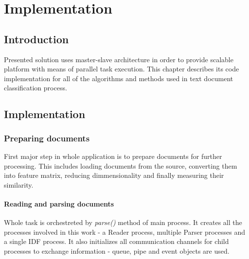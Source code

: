 \chapter{Implementation} \label{implementation}

\section{Introduction}
Presented solution uses master-slave architecture in order to provide scalable platform with means of parallel task execution. This chapter describes its code implementation for all of the algorithms and methods used in text document classification process.


\section{Implementation}
\subsection{Preparing documents}
First major step in whole application is to prepare documents for further processing. This includes loading documents from the source, converting them into feature matrix, reducing dimmensionality and finally measuring their similarity.

\subsubsection{Reading and parsing documents}

Whole task is orchestreted by \textit{parse()} method of main process. It creates all the processes involved in this work - a Reader process, multiple Parser processes and a single IDF process. It also initializes all communication channels for child processes to exchange information - queue, pipe and event objects are used.

